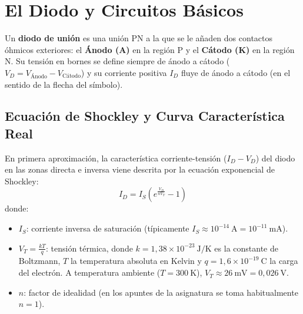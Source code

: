 \section{El Diodo y Circuitos Básicos}

Un \textbf{diodo de unión} es una unión PN a la que se le añaden dos contactos óhmicos exteriores: el \textbf{Ánodo (A)} en la región P y el \textbf{Cátodo (K)} en la región N. Su tensión en bornes se define siempre de ánodo a cátodo ($V_D = V_{\text{Ánodo}} - V_{\text{Cátodo}}$) y su corriente positiva $I_D$ fluye de ánodo a cátodo (en el sentido de la flecha del símbolo).

\subsection{Ecuación de Shockley y Curva Característica Real}
\begin{ley}
En primera aproximación, la característica corriente-tensión ($I_D - V_D$) del diodo en las zonas directa e inversa viene descrita por la ecuación exponencial de Shockley:
\begin{equation}
    I_D = I_S \left( e^{\frac{V_D}{n V_T}} - 1 \right)
\end{equation}
donde:
\begin{itemize}[leftmargin=*]
    \item $I_S$: corriente inversa de saturación (típicamente $I_S \approx 10^{-14}\ \si{\ampere} = 10^{-11}\ \si{\milli\ampere}$).
    \item $V_T = \frac{k T}{q}$: tensión térmica, donde $k = 1{,}38 \times 10^{-23}\ \si{\joule\per\kelvin}$ es la constante de Boltzmann, $T$ la temperatura absoluta en Kelvin y $q = 1{,}6 \times 10^{-19}\ \si{\coulomb}$ la carga del electrón. A temperatura ambiente ($T = 300\ \si{\kelvin}$), $V_T \approx 26\ \si{\milli\volt} = 0{,}026\ \si{\volt}$.
    \item $n$: factor de idealidad (en los apuntes de la asignatura se toma habitualmente $n = 1$).
\end{itemize}
\end{ley}


